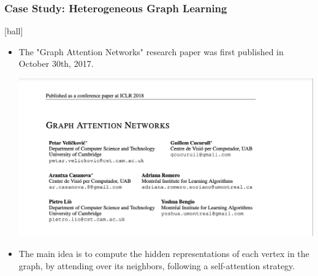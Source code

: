 \documentclass{beamer}
\begin{document}

\begin{frame}[fragile]
\frametitle{Case Study: Heterogeneous Graph Learning}
[ball]

\hspace{3cm}
\begin{minipage}[c]{0.4\textwidth}
    \hspace{1cm}
    
\end{minipage}

\end{frame}


\begin{frame}[fragile]
\begin{itemize}
\frametitle{Graph Attention Network (GAT)}
[ball]

\item The "Graph Attention Networks" research paper was first published in October 30th, 2017. 

\vspace{0.3cm}

\begin{minipage}[c]{\linewidth}
    \hspace{1.5cm}
    \includegraphics[width=0.7\linewidth]{GNN/imgs/gat.png}
\end{minipage}

\vspace{0.3cm}

\item The main idea is to compute the hidden representations of each vertex in the
graph, by attending over its neighbors, following a self-attention strategy.

\end{itemize}
\end{frame}
\end{document}
